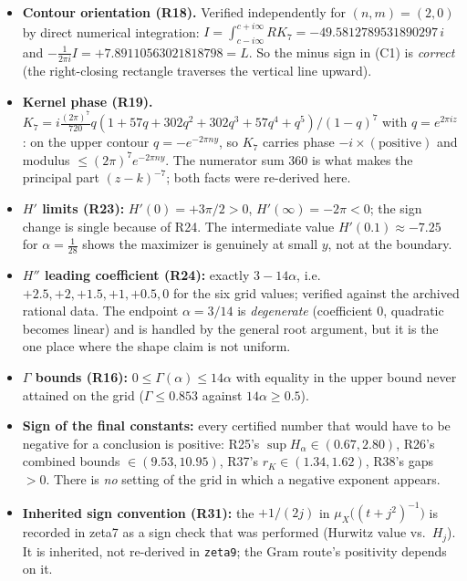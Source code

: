 \documentclass[11pt]{article}
\begin{document}
\begin{itemize}[leftmargin=1.4em]
\item \textbf{Contour orientation (R18).} Verified independently for $(n,m)=(2,0)$ by direct numerical
      integration: $I=\int_{c-i\infty}^{c+i\infty}RK_7 = -49.5812789531890297\,i$ and
      $-\tfrac{1}{2\pi i}I=+7.89110563021818798=L$. So the minus sign in (C1) is \emph{correct}
      (the right-closing rectangle traverses the vertical line upward).
\item \textbf{Kernel phase (R19).} $K_7=i\frac{(2\pi)^7}{720}q(1+57q+302q^2+302q^3+57q^4+q^5)/(1-q)^7$
      with $q=e^{2\pi iz}$: on the upper contour $q=-e^{-2\pi ny}$, so $K_7$ carries phase
      $-i\times(\text{positive})$ and modulus $\le(2\pi)^{7}e^{-2\pi ny}$. The numerator sum $360$
      is what makes the principal part $(z-k)^{-7}$; both facts were re-derived here.
\item \textbf{$H'$ limits (R23):} $H'(0)=+3\pi/2>0$, $H'(\infty)=-2\pi<0$; the sign change is single
      because of R24. The intermediate value $H'(0.1)\approx-7.25$ for $\alpha=\tfrac1{28}$ shows the
      maximizer is genuinely at small $y$, not at the boundary.
\item \textbf{$H''$ leading coefficient (R24):} exactly $3-14\alpha$, i.e.\ $+2.5,+2,+1.5,+1,+0.5,0$
      for the six grid values; verified against the archived rational data. The endpoint
      $\alpha=3/14$ is \emph{degenerate} (coefficient $0$, quadratic becomes linear) and is handled by
      the general root argument, but it is the one place where the shape claim is not uniform.
\item \textbf{$\Gamma$ bounds (R16):} $0\le\Gamma(\alpha)\le14\alpha$ with equality in the upper bound
      never attained on the grid ($\Gamma\le0.853$ against $14\alpha\ge0.5$).
\item \textbf{Sign of the final constants:} every certified number that would have to be negative for a
      conclusion is positive: R25's $\sup H_\alpha\in(0.67,2.80)$, R26's combined bounds
      $\in(9.53,10.95)$, R37's $r_K\in(1.34,1.62)$, R38's gaps $>0$. There is \emph{no} setting of the
      grid in which a negative exponent appears.
\item \textbf{Inherited sign convention (R31):} the $+1/(2j)$ in $\mu_X\bigl((t+j^2)^{-1}\bigr)$ is
      recorded in zeta7 as a sign check that was performed (Hurwitz value vs.\ $H_j$). It is inherited,
      not re-derived in \texttt{zeta9}; the Gram route's positivity depends on it.
\end{itemize}
\end{document}
